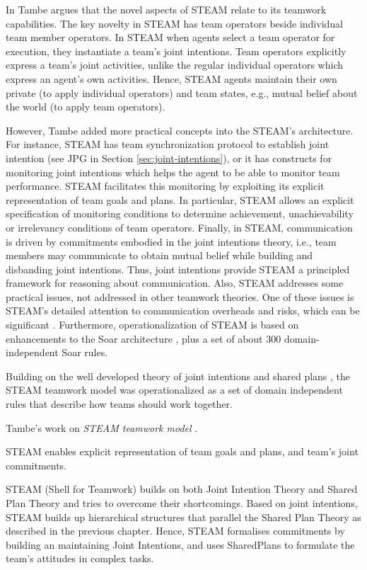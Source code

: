 \documentclass[11pt]{article}
\begin{document}
In \cite{tambe:flexible-teamwork} Tambe argues that the novel aspects of STEAM
relate to its teamwork capabilities. The key novelty in STEAM has team operators
beside individual team member operators. In STEAM when agents select a team
operator for execution, they instantiate a team's joint intentions. Team
operators explicitly express a team's joint activities, unlike the regular
individual operators which express an agent's own activities. Hence, STEAM
agents maintain their own private (to apply individual operators) and team
states, e.g., mutual belief about the world (to apply team operators).

However, Tambe added more practical concepts into the STEAM's architecture. For
instance, STEAM has team synchronization protocol to establish joint intention
(see JPG in Section \ref{sec:joint-intentions}), or it has constructs for
monitoring joint intentions which helps the agent to be able to monitor team
performance. STEAM facilitates this monitoring by exploiting its explicit
representation of team goals and plans. In particular, STEAM allows an explicit
specification of monitoring conditions to determine achievement, unachievability
or irrelevancy conditions of team operators. Finally, in STEAM, communication is
driven by commitments embodied in the joint intentions theory, i.e., team
members may communicate to obtain mutual belief while building and disbanding
joint intentions. Thus, joint intentions provide STEAM a principled framework
for reasoning about communication. Also, STEAM addresses some practical issues,
not addressed in other teamwork theories. One of these issues is STEAM's
detailed attention to communication overheads and risks, which can be
significant \cite{tambe:agent-archtecture-teamwork}. Furthermore,
operationalization of STEAM is based on enhancements to the Soar architecture
\cite{laird:soar}, plus a set of about 300 domain-independent Soar rules.

Building on the well developed theory of joint intentions \cite{cohen:teamwork}
and shared plans \cite{grosz:plans-discourse} \cite{grosz:collaboration}, the
STEAM teamwork model \cite{tambe:flexible-teamwork} was operationalized as a set
of domain independent rules that describe how teams should work together.

Tambe's work on \textit{STEAM teamwork model} \cite{tambe:flexible-teamwork}.

STEAM enables explicit representation of team goals and plans, and team’s
joint commitments.

STEAM (Shell for Teamwork) builds on both Joint Intention Theory and Shared Plan
Theory and tries to overcome their shortcomings. Based on joint intentions,
STEAM builds up hierarchical structures that parallel the Shared Plan Theory as
described in the previous chapter. Hence, STEAM formalises commitments by
building an  maintaining Joint Intentions, and uses SharedPlans to formulate the
team's attitudes in complex tasks.
\end{document}
